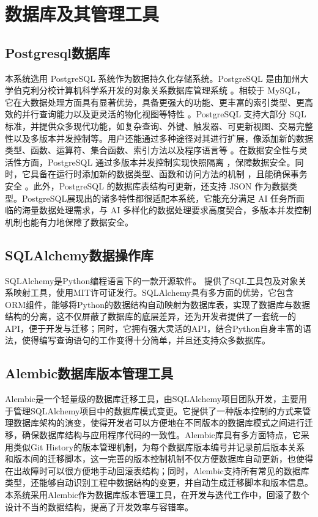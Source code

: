 \section{数据库及其管理工具}

\subsection{Postgresql数据库}

本系统选用 PostgreSQL 系统作为数据持久化存储系统。PostgreSQL 是由加州大学伯克利分校计算机科学系开发的对象关系数据库管理系统 \cite{3}。相较于 MySQL，它在大数据处理方面具有显著优势，具备更强大的功能、更丰富的索引类型、更高效的并行查询能力以及更灵活的物化视图等特性 \cite{18}。PostgreSQL 支持大部分 SQL 标准，并提供众多现代功能，如复杂查询、外键、触发器、可更新视图、交易完整性以及多版本并发控制等。用户还能通过多种途径对其进行扩展，像添加新的数据类型、函数、运算符、集合函数、索引方法以及程序语言等 \cite{4}。在数据安全性与灵活性方面，PostgreSQL 通过多版本并发控制实现快照隔离 \cite{17}，保障数据安全。同时，它具备在运行时添加新的数据类型、函数和访问方法的机制 \cite{19}，且能确保事务安全 \cite{9520330}。此外，PostgreSQL 的数据库表结构可更新，还支持 JSON 作为数据类型。PostgreSQL展现出的诸多特性都很适配本系统，它能充分满足 AI 任务所面临的海量数据处理需求，与 AI 多样化的数据处理要求高度契合，多版本并发控制机制也能有力地保障了数据安全。 

\subsection{SQLAlchemy数据操作库}

SQLAlchemy是Python编程语言下的一款开源软件。 提供了SQL工具包及对象关系映射工具，使用MIT许可证发行\cite{5}。SQLAlchemy具有多方面的优势，它包含ORM组件，能够将Python的数据结构自动映射为数据库表，实现了数据库与数据结构的分离，这不仅屏蔽了数据库的底层差异，还为开发者提供了一套统一的API，便于开发与迁移；同时，它拥有强大灵活的API，结合Python自身丰富的语法，使得编写查询语句的工作变得十分简单，并且还支持众多数据库。

\subsection{Alembic数据库版本管理工具}

Alembic是一个轻量级的数据库迁移工具，由SQLAlchemy项目团队开发，主要用于管理SQLAlchemy项目中的数据库模式变更。它提供了一种版本控制的方式来管理数据库架构的演变，使得开发者可以方便地在不同版本的数据库模式之间进行迁移，确保数据库结构与应用程序代码的一致性。Alembic库具有多方面特点，它采用类似Git History的版本管理机制，为每个数据库版本编号并记录前后版本关系和版本间的迁移脚本，这一完善的版本控制机制不仅方便数据库自动更新，也使得在出故障时可以很方便地手动回滚表结构；同时，Alembic支持所有常见的数据库类型，还能够自动识别工程中数据结构的变更，并自动生成迁移脚本和版本信息。本系统采用Alembic作为数据库版本管理工具，在开发与迭代工作中，回滚了数个设计不当的数据结构，提高了开发效率与容错率。

